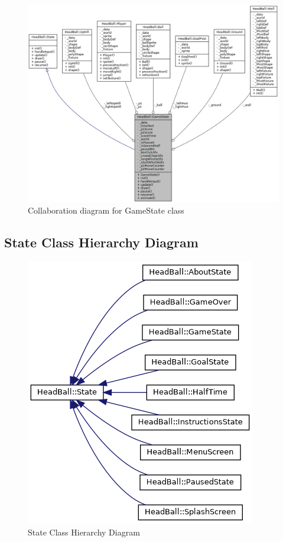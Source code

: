 \documentclass[main]{subfiles}
\begin{document}
\begin{figure}[H]
    \centering
    \includegraphics[scale=0.4]{graphics/UML_diagrams/gamestate_collab.png}
    \caption{Collaboration diagram for GameState class}
    \label{fig:collaboration_diagram_GameState}
\end{figure}

\newpage

\subsection{State Class Hierarchy Diagram}
\begin{figure}[H]
    \centering
    \includegraphics[scale=0.5]{graphics/UML_diagrams/state_hierarchy_brief.png}
    \caption{State Class Hierarchy Diagram}
    \label{fig:state_hierarchy_brief}
\end{figure}
\end{document}
